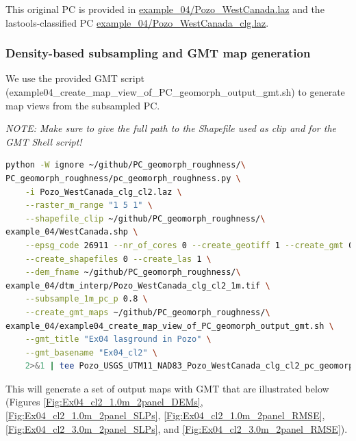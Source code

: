 \documentclass[a4paperpaper,,tablecaptionabove]{scrartcl}
\begin{document}
This original PC is provided in
\href{https://github.com/BodoBookhagen/PC_geomorph_roughness/blob/master/example_04/Pozo_WestCanada.laz}{example\_04/Pozo\_WestCanada.laz}
and the lastools-classified PC
\href{https://github.com/BodoBookhagen/PC_geomorph_roughness/blob/master/example_04/Pozo_WestCanada_clg.laz}{example\_04/Pozo\_WestCanada\_clg.laz}.

\hypertarget{density-based-subsampling-and-gmt-map-generation-1}{%
\subsubsection{Density-based subsampling and GMT map
generation}\label{density-based-subsampling-and-gmt-map-generation-1}}

We use the provided GMT script
(example04\_create\_map\_view\_of\_PC\_geomorph\_output\_gmt.sh) to
generate map views from the subsampled PC.

\emph{NOTE: Make sure to give the full path to the Shapefile used as
clip and for the GMT Shell script!}

\begin{lstlisting}[language=bash]
python -W ignore ~/github/PC_geomorph_roughness/\
PC_geomorph_roughness/pc_geomorph_roughness.py \
    -i Pozo_WestCanada_clg_cl2.laz \
    --raster_m_range "1 5 1" \
    --shapefile_clip ~/github/PC_geomorph_roughness/\
example_04/WestCanada.shp \
    --epsg_code 26911 --nr_of_cores 0 --create_geotiff 1 --create_gmt 0  \
    --create_shapefiles 0 --create_las 1 \
    --dem_fname ~/github/PC_geomorph_roughness/\
example_04/dtm_interp/Pozo_WestCanada_clg_cl2_1m.tif \
    --subsample_1m_pc_p 0.8 \
    --create_gmt_maps ~/github/PC_geomorph_roughness/\
example_04/example04_create_map_view_of_PC_geomorph_output_gmt.sh \
    --gmt_title "Ex04 lasground in Pozo" \
    --gmt_basename "Ex04_cl2" \
    2>&1 | tee Pozo_USGS_UTM11_NAD83_Pozo_WestCanada_clg_cl2_pc_geomorph_roughness_subsample_p08_1_5_1.log
\end{lstlisting}

This will generate a set of output maps with GMT that are illustrated
below (Figures \ref{Fig:Ex04_cl2_1.0m_2panel_DEMs},
\ref{Fig:Ex04_cl2_1.0m_2panel_SLPs},
\ref{Fig:Ex04_cl2_1.0m_2panel_RMSE},
\ref{Fig:Ex04_cl2_3.0m_2panel_SLPs}, and
\ref{Fig:Ex04_cl2_3.0m_2panel_RMSE}).
\end{document}
